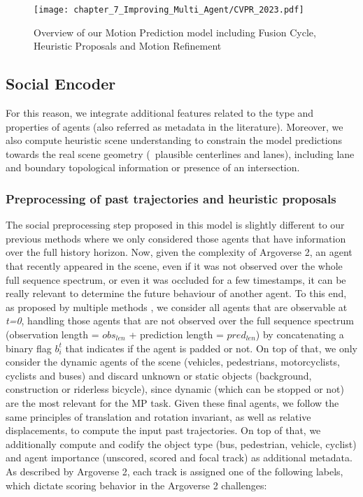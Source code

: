 \begin{figure}[h] 
	\centering
	\texttt{[image: chapter\_7\_Improving\_Multi\_Agent/CVPR\_2023.pdf]}
	\caption{Overview of our Motion Prediction model including Fusion Cycle, Heuristic Proposals and Motion Refinement}
	\label{fig:chapter_7_Improving_Multi_Agent/CVPR_2023}
\end{figure}

\subsection{Social Encoder}
\label{subsubsec:7_improving_efficiency_social_encoder}

For this reason, we integrate additional features related to the type and properties of agents (also referred as metadata in the literature). Moreover, we also compute heuristic scene understanding to constrain the model predictions towards the real scene geometry (\eg \ plausible centerlines and lanes), including lane and boundary topological information or presence of an intersection. 

\subsubsection{Preprocessing of past trajectories and heuristic proposals}
\label{subsubsec:7_improving_efficiency_preprocessing}

The social preprocessing step proposed in this model is slightly different to our previous methods where we only considered those agents that have information over the full history horizon. Now, given the complexity of Argoverse 2, an agent that recently appeared in the scene, even if it was not observed over the whole full sequence spectrum, or even it was occluded for a few timestamps, it can be really relevant to determine the future behaviour of another agent. To this end, as proposed by multiple methods \cite{liang2020learning, schmidt2022crat}, we consider all agents that are observable at \textit{t=0}, handling those agents that are not observed over the full sequence spectrum (observation length = \textit{$obs_{len}$} + prediction length = \textit{$pred_{len}$}) by concatenating a binary flag $b_i^t$ that indicates if the agent is padded or not. On top of that, we only consider the dynamic agents of the scene (vehicles, pedestrians, motorcyclists, cyclists and buses) and discard unknown or static objects (background, construction or riderless bicycle), since dynamic (which can be stopped or not) are the most relevant for the \ac{MP} task. Given these final agents, we follow the same principles of translation and rotation invariant, as well as relative displacements, to compute the input past trajectories. On top of that, we additionally compute and codify the object type (bus, pedestrian, vehicle, cyclist) and agent importance (unscored, scored and focal track) as additional metadata. As described by Argoverse 2, each track is assigned one of the following labels, which dictate scoring behavior in the Argoverse 2 challenges:


